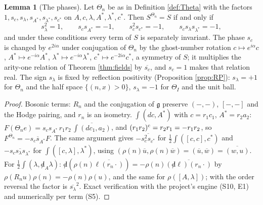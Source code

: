 \documentclass[11pt]{article}
\theoremstyle{definition}
\newtheorem{lemma}[definition]{Lemma}
\begin{document}
\begin{lemma}[The phases]
\label{lem:phases}
Let $\Theta_n$ be as in Definition \ref{def:Theta} with the factors $1,s_c,s_\lambda,s_{A^*},s_{\lambda^*},s_{c^*}$ on $A,c,\lambda,A^*,\lambda^*,c^*$. Then $S^{\Theta_n}=S$ if and only if
\[
s_\lambda^2=1,\qquad s_cs_{A^*}=-1,\qquad s_c^2s_{c^*}=-1,\qquad s_cs_\lambda s_{\lambda^*}=-1,
\]
and under these conditions every term of $S$ is separately invariant. The phase $s_c$ is changed by $e^{2i\alpha}$ under conjugation of $\Theta_n$ by the ghost-number rotation $c\mapsto e^{i\alpha}c$, $A^*\mapsto e^{-i\alpha}A^*$, $\lambda^*\mapsto e^{-i\alpha}\lambda^*$, $c^*\mapsto e^{-2i\alpha}c^*$, a symmetry of $S$; it multiplies the arity-one relation of Theorem \ref{thm:fields} by $\overline{s_c}$, and $s_c=1$ makes that relation real. The sign $s_\lambda$ is fixed by reflection positivity (Proposition \ref{prop:RP}): $s_\lambda=+1$ for $\Theta_n$ and the half space $\{(n,x)>0\}$, $s_\lambda=-1$ for $\Theta_I$ and the unit ball.
\end{lemma}

\begin{proof}
Bosonic terms: $R_n$ and the conjugation of $\mathfrak g$ preserve $(-,-)$, $[-,-]$ and the Hodge pairing, and $r_n$ is an isometry. $\int(dc,A^*)$ with $c=r_1c_1$, $A^*=r_2a_2$: $F(\Theta_ne)=s_cs_{A^*}\,r_1r_2\,\overline{\int(dc_1,a_2)}$, and $(r_1r_2)^{\rm c}=r_2r_1=-r_1r_2$, so $F^{\Theta_n}=-\overline{s_cs_{A^*}}F$. The same argument gives $-\overline{s_c^2s_{c^*}}$ for $\frac12\int([c,c],c^*)$ and $-\overline{s_cs_\lambda s_{\lambda^*}}$ for $\int([c,\lambda],\lambda^*)$, using $(\rho(n)\overline u,\rho(n)\overline w)=(\overline u,\overline w)=\overline{(w,u)}$. For $\frac12\int(\lambda,{\not d}_A\lambda)$: ${\not d}(\rho(n)\overline{\ell(r_n\cdot)})=-\rho(n)\overline{({\not d}\ell)(r_n\cdot)}$ by $\rho(R_nu)\rho(n)=-\rho(n)\rho(u)$, and the same for $\rho([A,\lambda])$; with the order reversal the factor is $\overline{s_\lambda}^2$. Exact verification with the project's engine (S10, E1) and numerically per term (S5).
\end{proof}
\end{document}
